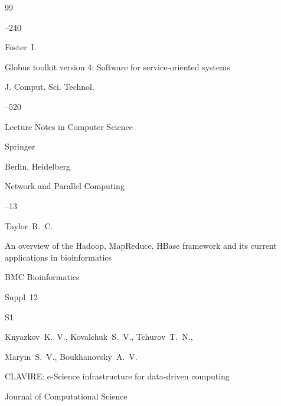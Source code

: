\begin{thebibliography}{99}

--240






\by Foster~I.

\paper Globus toolkit version 4: Software for service-oriented   systems

\jour J. Comput. Sci. Technol.





--520 

\moreref



\serial Lecture Notes in Computer Science 

\publ Springer 

\publaddr Berlin, Heidelberg


\inbook  Network and Parallel Computing

--13








\by Taylor~R.~C.

\paper An overview of the Hadoop, MapReduce, HBase framework  and its current applications in bioinformatics 

\jour BMC Bioinformatics




\issueinfo Suppl~12

\pages S1






\by Knyazkov~K.~V., Kovalchuk~S.~V., Tchurov~T.~N.,

 Maryin~S.~V., Boukhanovsky~A.~V.

 \paper CLAVIRE:   e-Science infrastructure for data-driven computing

\jour Journal of  Computational Science


\end{thebibliography}
